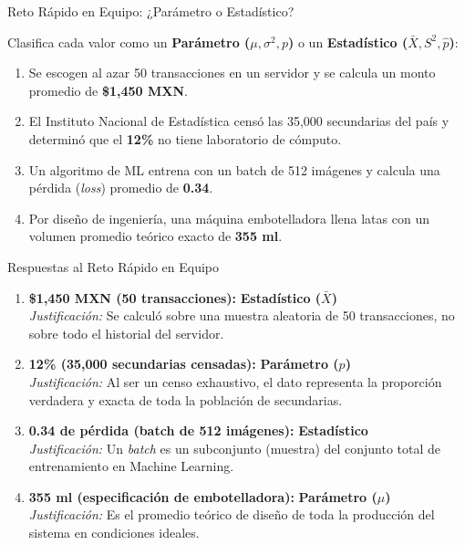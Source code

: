 \documentclass[10pt,aspectratio=169]{beamer}
\begin{document}
\begin{frame}{Reto Rápido en Equipo: ¿Parámetro o Estadístico?}
  \begin{retoclase}
    Clasifica cada valor como un \textbf{Parámetro ($\mu, \sigma^2, p$)} o un \textbf{Estadístico ($\bar{X}, S^2, \hat{p}$)}:
  \end{retoclase}
  
  \vspace{0.5em}
  \begin{enumerate}
    \item Se escogen al azar 50 transacciones en un servidor y se calcula un monto promedio de \textbf{\$1,450 MXN}. \pause
    \item El Instituto Nacional de Estadística censó las 35,000 secundarias del país y determinó que el \textbf{12\%} no tiene laboratorio de cómputo. \pause
    \item Un algoritmo de ML entrena con un batch de 512 imágenes y calcula una pérdida (\emph{loss}) promedio de \textbf{0.34}. \pause
    \item Por diseño de ingeniería, una máquina embotelladora llena latas con un volumen promedio teórico exacto de \textbf{355 ml}.
  \end{enumerate}
\end{frame}

\begin{frame}{Respuestas al Reto Rápido en Equipo}
  \begin{enumerate}
    \item \textbf{\$1,450 MXN (50 transacciones):} \color{TecAzulOscuro}\textbf{Estadístico ($\bar{X}$)}\color{black} \pause
       \\ \small \textit{Justificación:} Se calculó sobre una muestra aleatoria de 50 transacciones, no sobre todo el historial del servidor. \pause
    \item \textbf{12\% (35,000 secundarias censadas):} \color{TecRojo}\textbf{Parámetro ($p$)}\color{black} \pause
       \\ \small \textit{Justificación:} Al ser un censo exhaustivo, el dato representa la proporción verdadera y exacta de toda la población de secundarias. \pause
    \item \textbf{0.34 de pérdida (batch de 512 imágenes):} \color{TecAzulOscuro}\textbf{Estadístico}\color{black} \pause
       \\ \small \textit{Justificación:} Un \emph{batch} es un subconjunto (muestra) del conjunto total de entrenamiento en Machine Learning. \pause
    \item \textbf{355 ml (especificación de embotelladora):} \color{TecRojo}\textbf{Parámetro ($\mu$)}\color{black} \pause
       \\ \small \textit{Justificación:} Es el promedio teórico de diseño de toda la producción del sistema en condiciones ideales.
  \end{enumerate}
\end{frame}
\end{document}
